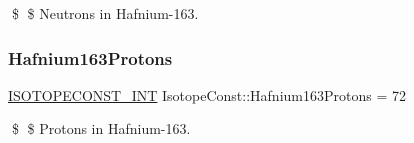 \$ \$ Neutrons in Hafnium-\/163. \mbox{\label{group___isotope_const-_hafnium-_hf163_gaa3f0028984d12cf24ee5581e4bf155f1}} 
\subsubsection{\texorpdfstring{Hafnium163\+Protons}{Hafnium163Protons}}
{\footnotesize\ttfamily \mbox{\hyperlink{group___isotope_const-_macros_ga5f18360b3e99483a35c32d789e62621c}{I\+S\+O\+T\+O\+P\+E\+C\+O\+N\+S\+T\+\_\+\+I\+NT}} Isotope\+Const\+::\+Hafnium163\+Protons = 72}

\$ \$ Protons in Hafnium-\/163. 